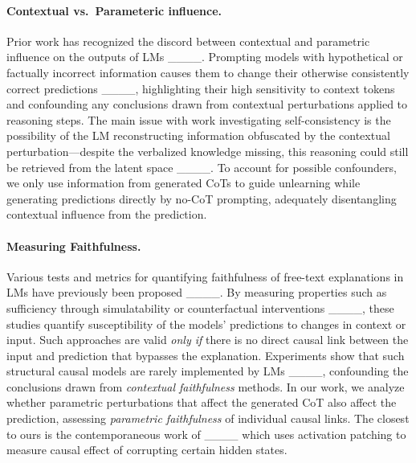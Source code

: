 \paragraph{Contextual vs.\ Parameteric influence.}  
Prior work has recognized the discord between contextual and parametric influence on the outputs of LMs ____.
Prompting models with hypothetical or factually incorrect information causes them to change their otherwise consistently correct predictions ____, highlighting their high sensitivity to context tokens and confounding any conclusions drawn from contextual perturbations applied to reasoning steps.
The main issue with work investigating self-consistency is the possibility of the LM reconstructing information obfuscated by the contextual perturbation---despite the verbalized knowledge missing, this reasoning could still be retrieved from the latent space ____.
To account for possible confounders, we only use information from generated CoTs to guide unlearning while generating predictions directly by no-CoT prompting, adequately disentangling contextual influence from the prediction.
%



\paragraph{Measuring Faithfulness.}
Various tests and metrics for quantifying faithfulness of free-text explanations in LMs have previously been proposed ____.
By measuring properties such as sufficiency through simulatability or counterfactual interventions ____, these studies quantify susceptibility of the models' predictions to changes in context or input.
Such approaches are valid \textit{only if} there is no direct causal link between the input and prediction that bypasses the explanation.
%
Experiments show that such structural causal models are rarely implemented by LMs ____, confounding the conclusions drawn from \textit{contextual faithfulness} methods.
%
%
In our work, we analyze whether parametric perturbations that affect the generated CoT also affect the prediction, assessing \textit{parametric faithfulness} of individual causal links.
The closest to ours is the contemporaneous work of ____ which uses activation patching to measure causal effect of corrupting certain hidden states.
%

%

%
%

%
%
%
%

%
%
%
%

%

%

%
%
%
%
%
